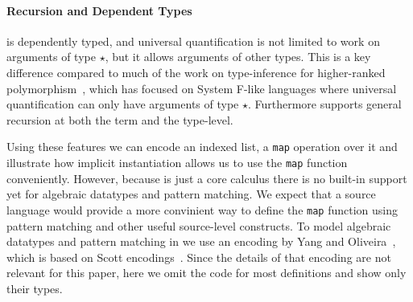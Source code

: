 \paragraph{Recursion and Dependent Types}

\name is dependently typed, and universal quantification is not limited to work
on arguments of type $\star$, but it allows arguments of other types. This is
a key difference compared to much of the work on type-inference for higher-ranked
polymorphism~\cite{}, which has focused on System F-like
languages where universal quantification can only have arguments of type $\star$.
Furthermore \name supports general recursion at both the term and the type-level.

Using these features we can encode an indexed list, a \verb|map| operation over it
and illustrate how implicit instantiation allows us to use the \verb|map| function
conveniently.
However, because \name is just a core calculus there is no built-in support
yet for algebraic datatypes and pattern matching.
We expect that a source language would provide a more convinient
way to define the \verb|map| function using pattern matching and other useful source-level
constructs. To model algebraic datatypes and pattern matching in \name we
use an encoding by Yang and Oliveira~\cite{pits}, which is based on Scott encodings~\cite{}.
Since the details of that encoding are not relevant for this paper,
here we omit the code for most definitions and show only their types.

